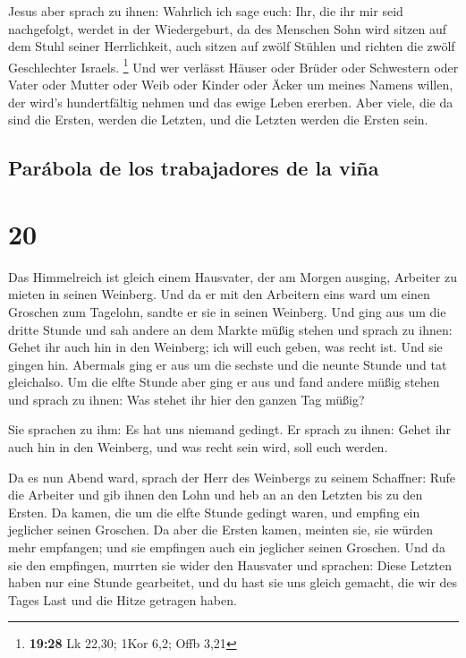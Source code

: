  Jesus aber sprach zu ihnen: Wahrlich ich sage euch: Ihr,
die ihr mir seid nachgefolgt, werdet in der Wiedergeburt, da des
Menschen Sohn wird sitzen auf dem Stuhl seiner Herrlichkeit, auch sitzen
auf zwölf Stühlen und richten die zwölf Geschlechter Israels.
\footnote{\textbf{19:28} Lk 22,30; 1Kor 6,2; Offb 3,21} 
Und wer verlässt Häuser oder Brüder oder Schwestern oder Vater oder
Mutter oder Weib oder Kinder oder Äcker um meines Namens willen, der
wird's hundertfältig nehmen und das ewige Leben ererben. 
Aber viele, die da sind die Ersten, werden die Letzten, und die Letzten
werden die Ersten sein.

\hypertarget{paruxe1bola-de-los-trabajadores-de-la-viuxf1a}{%
\subsection{Parábola de los trabajadores de la
viña}\label{paruxe1bola-de-los-trabajadores-de-la-viuxf1a}}

\hypertarget{section-19}{%
\section{20}\label{section-19}}

 Das Himmelreich ist gleich einem Hausvater, der am Morgen
ausging, Arbeiter zu mieten in seinen Weinberg.  Und da er
mit den Arbeitern eins ward um einen Groschen zum Tagelohn, sandte er
sie in seinen Weinberg.  Und ging aus um die dritte Stunde
und sah andere an dem Markte müßig stehen  und sprach zu
ihnen: Gehet ihr auch hin in den Weinberg; ich will euch geben, was
recht ist.  Und sie gingen hin. Abermals ging er aus um
die sechste und die neunte Stunde und tat gleichalso.  Um
die elfte Stunde aber ging er aus und fand andere müßig stehen und
sprach zu ihnen: Was stehet ihr hier den ganzen Tag müßig?

 Sie sprachen zu ihm: Es hat uns niemand gedingt. Er
sprach zu ihnen: Gehet ihr auch hin in den Weinberg, und was recht sein
wird, soll euch werden.

 Da es nun Abend ward, sprach der Herr des Weinbergs zu
seinem Schaffner: Rufe die Arbeiter und gib ihnen den Lohn und heb an an
den Letzten bis zu den Ersten.  Da kamen, die um die elfte
Stunde gedingt waren, und empfing ein jeglicher seinen Groschen.
 Da aber die Ersten kamen, meinten sie, sie würden mehr
empfangen; und sie empfingen auch ein jeglicher seinen Groschen.
 Und da sie den empfingen, murrten sie wider den
Hausvater  und sprachen: Diese Letzten haben nur eine
Stunde gearbeitet, und du hast sie uns gleich gemacht, die wir des Tages
Last und die Hitze getragen haben.

